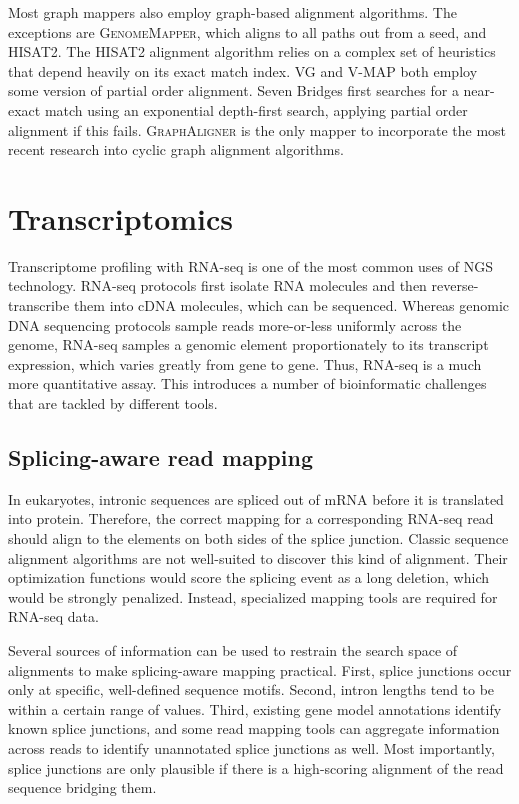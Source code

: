 \documentclass[11pt]{ucthesis}
\begin{document}
Most graph mappers also employ graph-based alignment algorithms. 
The exceptions are \textsc{GenomeMapper}, which aligns to all paths out from a seed, and \textsc{HISAT2}.
The \textsc{HISAT2} alignment algorithm relies on a complex set of heuristics that depend heavily on its exact match index.
\textsc{VG} and \textsc{V-MAP} both employ some version of partial order alignment.
Seven Bridges first searches for a near-exact match using an exponential depth-first search, applying partial order alignment if this fails.
\textsc{GraphAligner} is the only mapper to incorporate the most recent research into cyclic graph alignment algorithms.

\section{Transcriptomics}

Transcriptome profiling with RNA-seq is one of the most common uses of NGS technology\cite{mortazavi2008mapping}. RNA-seq protocols first isolate RNA molecules and then reverse-transcribe them into cDNA molecules, which can be sequenced. Whereas genomic DNA sequencing protocols sample reads more-or-less uniformly across the genome, RNA-seq samples a genomic element proportionately to its transcript expression, which varies greatly from gene to gene. Thus, RNA-seq is a much more quantitative assay. This introduces a number of bioinformatic challenges that are tackled by different tools.

\subsection{Splicing-aware read mapping} 
 
In eukaryotes, intronic sequences are spliced out of mRNA before it is translated into protein. Therefore, the correct mapping for a corresponding RNA-seq read should align to the elements on both sides of the splice junction. Classic sequence alignment algorithms are not well-suited to discover this kind of alignment. Their optimization functions would score the splicing event as a long deletion, which would be strongly penalized. Instead, specialized mapping tools are required for RNA-seq data\cite{dobin2013star,kim2013tophat2,kim2015hisat}.
 
Several sources of information can be used to restrain the search space of alignments to make splicing-aware mapping practical. First, splice junctions occur only at specific, well-defined sequence motifs\cite{burset2000analysis}. Second, intron lengths tend to be within a certain range of values\cite{gotoh2018modeling}. Third, existing gene model annotations identify known splice junctions\cite{dobin2013star}, and some read mapping tools can aggregate information across reads to identify unannotated splice junctions as well\cite{kim2013tophat2}. Most importantly, splice junctions are only plausible if there is a high-scoring alignment of the read sequence bridging them.
\end{document}
